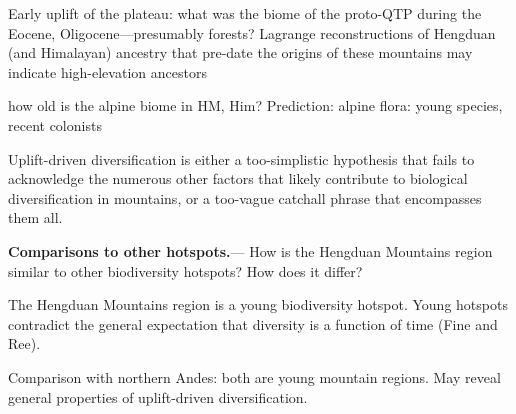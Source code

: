 
Early uplift of the plateau: what was the biome of the proto-QTP during the Eocene, Oligocene---presumably forests? Lagrange reconstructions of Hengduan (and Himalayan) ancestry that pre-date the origins of these mountains may indicate high-elevation ancestors

how old is the alpine biome in HM, Him? Prediction: alpine flora: young species, recent colonists

Uplift-driven diversification is either a too-simplistic hypothesis that fails to acknowledge the numerous other factors that likely contribute to biological diversification in mountains, or a too-vague catchall phrase that encompasses them all.


\textbf{Comparisons to other hotspots.}---%
How is the Hengduan Mountains region similar to other biodiversity hotspots? How does it differ?

The Hengduan Mountains region is a young biodiversity hotspot. Young hotspots contradict the general expectation that diversity is a function of time (Fine and Ree).

Comparison with northern Andes: both are young mountain regions. May reveal general properties of uplift-driven diversification.

